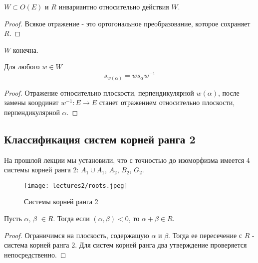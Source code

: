 \documentclass[a4article]{article}
\begin{document}
\begin{lemma}
$W \subset O(E)$ и $R$ инвариантно относительно действия $W$.
\end{lemma}
\begin{proof}
   Всякое отражение - это ортогональное преобразование, которое сохраняет $R$.
\end{proof}
\begin{corollary}
    $W$ конечна.
\end{corollary}
\begin{lemma}
Для любого $w \in W$
    \begin{equation}
        s_{w(\alpha)}=w s_{\alpha} w^{-1}
    \end{equation}
\end{lemma}
\begin{proof}
    Отражение относительно плоскости, перпендикулярной $w(\alpha)$, после замены координат $w^{-1}: E \rightarrow E$ станет отражением относительно плоскости, перпендикулярной $\alpha$.
\end{proof}
\subsection*{Классификация систем корней ранга 2}
На прошлой лекции мы установили, что с точностью до изоморфизма имеется 4 системы корней ранга 2: $A_1 \cup A_1$, $A_2$, $B_2$, $G_2$.
\begin{figure}[h!]
    \centering
    \texttt{[image: lectures2/roots.jpeg]}
    \caption{Системы корней ранга 2}
    \label{fig:enter-label}
\end{figure}
\begin{lemma}
\label{sum_of_roots}
    Пусть $\alpha$, $\beta$ $\in R$. Тогда если $(\alpha, \beta) < 0$, то $\alpha + \beta \in R$.
\end{lemma}
\begin{proof}
    Ограничимся на плоскость, содержащую $\alpha$ и $\beta$. Тогда ее пересечение с $R$ -  система корней ранга 2. Для систем корней ранга два утверждение проверяется непосредственно.
\end{proof}
\end{document}

